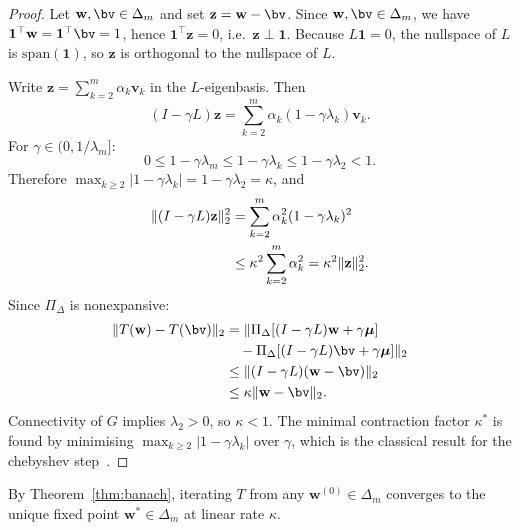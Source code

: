 \documentclass[twocolumn,11pt,a4paper]{article}
\theoremstyle{remark}
\newcommand{\one}{\mathbf{1}}
\newcommand{\bw}{\mathbf{w}}
\newcommand{\bmu}{\bm{\mu}}
\newcommand{\Dm}{\Delta_m}
\newcommand{\lam}[1]{\lambda_{#1}}
\newcommand{\kap}{\kappa}
\newcommand{\Proj}{\Pi_\Delta}
\begin{document}
\begin{proof}
Let $\bw, \bv \in \Dm$ and set $\mathbf{z} = \bw - \bv$.
Since $\bw,\bv\in\Dm$, we have $\one^\top\bw = \one^\top\bv = 1$,
hence $\one^\top\mathbf{z} = 0$, i.e.\ $\mathbf{z}\perp\one$.
Because $L\one = 0$, the nullspace of $L$ is $\mathrm{span}(\one)$,
so $\mathbf{z}$ is orthogonal to the nullspace of $L$.

Write $\mathbf{z} = \sum_{k=2}^m \alpha_k \mathbf{v}_k$ in the $L$-eigenbasis.
Then
\begin{equation}
  (I-\gamma L)\mathbf{z} = \sum_{k=2}^m \alpha_k(1-\gamma\lam{k})\mathbf{v}_k.
\end{equation}
For $\gamma\in(0,1/\lam{m}]$:
\begin{equation}
  0 \leq 1-\gamma\lam{m} \leq 1-\gamma\lam{k} \leq 1-\gamma\lam{2} < 1.
\end{equation}
Therefore $\max_{k\geq 2}|1-\gamma\lam{k}| = 1-\gamma\lam{2} = \kap$, and
\begin{align}
  \|(I-\gamma L)\mathbf{z}\|_2^2
  &= \sum_{k=2}^m \alpha_k^2(1-\gamma\lam{k})^2 \notag\\
  &\leq \kap^2\sum_{k=2}^m\alpha_k^2
   = \kap^2\|\mathbf{z}\|_2^2.
\end{align}
Since $\Proj$ is nonexpansive:
\begin{align}
  \|T(\bw)-T(\bv)\|_2
  &= \|\Proj[(I-\gamma L)\bw+\gamma\bmu] \notag\\
  &\quad - \Proj[(I-\gamma L)\bv+\gamma\bmu]\|_2 \notag\\
  &\leq \|(I-\gamma L)(\bw-\bv)\|_2 \notag\\
  &\leq \kap\|\bw-\bv\|_2.
\end{align}
Connectivity of $G$ implies $\lam{2}>0$, so $\kap < 1$.
The minimal contraction factor $\kap^*$ is found by minimising
$\max_{k\geq 2}|1-\gamma\lam{k}|$ over $\gamma$, which is the classical
result for the chebyshev step~\cite{golub1996}.
\end{proof}

By Theorem~\ref{thm:banach}, iterating $T$ from any $\bw^{(0)}\in\Dm$ converges
to the unique fixed point $\bw^*\in\Dm$ at linear rate $\kap$.
\end{document}
